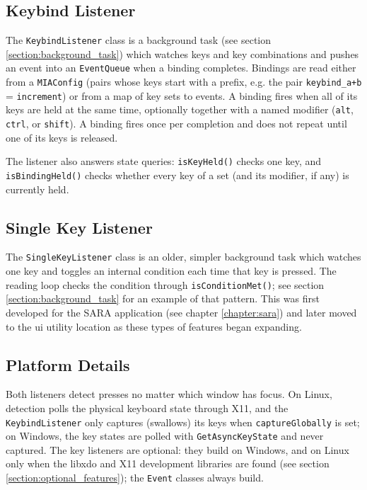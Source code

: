 \subsection{Keybind Listener}

The \texttt{KeybindListener} class is a background task (see section \ref{section:background_task}) which watches keys and key combinations and pushes an event into an \texttt{EventQueue} when a binding completes. Bindings are read either from a \texttt{MIAConfig} (pairs whose keys start with a prefix, e.g. the pair \texttt{keybind\_a+b} = \texttt{increment}) or from a map of key sets to events. A binding fires when all of its keys are held at the same time, optionally together with a named modifier (\texttt{alt}, \texttt{ctrl}, or \texttt{shift}). A binding fires once per completion and does not repeat until one of its keys is released.

The listener also answers state queries: \texttt{isKeyHeld()} checks one key, and \texttt{isBindingHeld()} checks whether every key of a set (and its modifier, if any) is currently held.

\subsection{Single Key Listener}

The \texttt{SingleKeyListener} class is an older, simpler background task which watches one key and toggles an internal condition each time that key is pressed. The reading loop checks the condition through \texttt{isConditionMet()}; see section \ref{section:background_task} for an example of that pattern. This was first developed for the SARA application (see chapter \ref{chapter:sara}) and later moved to the ui utility location as these types of features began expanding.

\subsection{Platform Details}

Both listeners detect presses no matter which window has focus. On Linux, detection polls the physical keyboard state through X11, and the \texttt{KeybindListener} only captures (swallows) its keys when \texttt{captureGlobally} is set; on Windows, the key states are polled with \texttt{GetAsyncKeyState} and never captured. The key listeners are optional: they build on Windows, and on Linux only when the libxdo and X11 development libraries are found (see section \ref{section:optional_features}); the \texttt{Event} classes always build.

